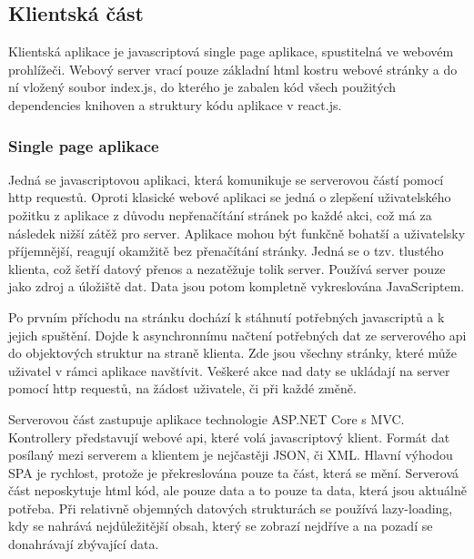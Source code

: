 \documentclass[FM,BP]{tulthesis}
\begin{document}
        \subsection{Klientská část}
            Klientská aplikace je javascriptová single page aplikace, spustitelná ve webovém prohlížeči. 
            Webový server vrací pouze základní html kostru webové stránky a do ní vložený soubor index.js, 
            do kterého je zabalen kód všech použitých dependencies knihoven a struktury kódu aplikace v react.js. \cite{6}

            \subsubsection{Single page aplikace}
                Jedná se javascriptovou aplikaci, která komunikuje se serverovou částí pomocí http requestů. 
                Oproti klasické webové aplikaci se jedná o zlepšení uživatelského požitku z aplikace z důvodu nepřenačítání stránek po každé akci, což má za následek nižší zátěž pro server. 
                Aplikace mohou být funkčně bohatší a uživatelsky příjemnější, reagují okamžitě bez přenačítání stránky. 
                Jedná se o tzv. tlustého klienta, což šetří datový přenos a nezatěžuje tolik server. 
                Používá server pouze jako zdroj a úložiště dat. 
                Data jsou potom kompletně vykreslována JavaScriptem.

                Po prvním příchodu na stránku dochází k stáhnutí potřebných javascriptů a k jejich spuštění. 
                Dojde k asynchronnímu načtení potřebných dat ze serverového api do objektových struktur na straně klienta. 
                Zde jsou všechny stránky, které může uživatel v rámci aplikace navštívit. 
                Veškeré akce nad daty se ukládají na server pomocí http requestů, na žádost uživatele, či při každé změně.

                Serverovou část zastupuje aplikace technologie ASP.NET Core s MVC. 
                Kontrollery představují webové api, které volá javascriptový klient. 
                Formát dat posílaný mezi serverem a klientem je nejčastěji JSON, či XML.
                Hlavní výhodou SPA je rychlost, protože je překreslována pouze ta část, která se mění. 
                Serverová část neposkytuje html kód, ale pouze data a to pouze ta data, která jsou aktuálně potřeba. 
                Při relativně objemných datových strukturách se používá lazy-loading, kdy se nahrává nejdůležitější obsah, 
                který se zobrazí nejdříve a na pozadí se donahrávají zbývající data.
\end{document}
